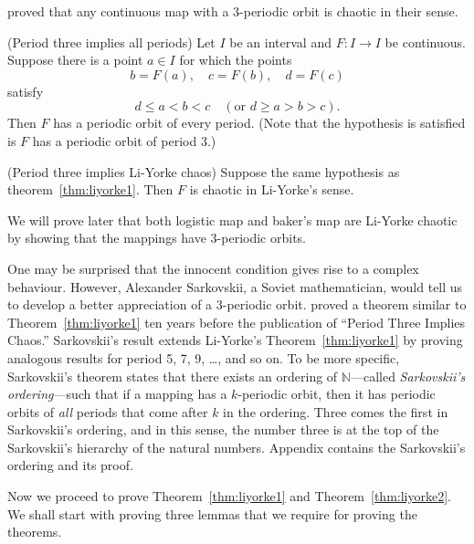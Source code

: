 \documentclass[12pt,draft,twoside]{book}
\begin{document}
\citet{li-yorke} proved that any continuous map with a 3-periodic orbit is chaotic in their sense.

\begin{theorem}
  (Period three implies all periods)
  Let $I$ be an interval and $F: I\to I$ be continuous. Suppose there is a point $a \in I$ for which
  the points
  \begin{equation*}
  b = F(a), \quad c = F(b), \quad d = F(c)
  \end{equation*}
  satisfy
  \begin{equation*}
    d \leq a < b < c \quad(\mbox{or } d \geq a > b > c).
  \end{equation*}
  Then $F$ has a periodic orbit of every period.
  (Note that the hypothesis is satisfied is $F$ has a periodic orbit of period 3.)
  \label{thm:liyorke1}
\end{theorem}

\begin{theorem}
  (Period three implies Li-Yorke chaos)
  Suppose the same hypothesis as theorem~\ref{thm:liyorke1}.
  Then $F$ is chaotic in Li-Yorke's sense.
  \label{thm:liyorke2}
\end{theorem}

\noindent We will prove later that both logistic map and baker's map are Li-Yorke chaotic by showing that the mappings have 3-periodic orbits.

One may be surprised that the innocent condition gives rise to a complex behaviour.
However, Alexander Sarkovskii, a Soviet mathematician, would tell us to develop a better appreciation of a 3-periodic orbit.
\citet{sarkovskii} proved a theorem similar to Theorem~\ref{thm:liyorke1} ten years before the publication of ``Period Three Implies Chaos.''
Sarkovskii's result extends Li-Yorke's Theorem~\ref{thm:liyorke1} by proving analogous results for period 5, 7, 9, \ldots, and so on.
To be more specific, Sarkovskii's theorem states that there exists an ordering of $\mathbb{N}$---called \textit{Sarkovskii's ordering}---such that if a mapping has a $k$-periodic orbit, then it has periodic orbits of \textit{all} periods that come after $k$ in the ordering.
Three comes the first in Sarkovskii's ordering, and in this sense, the number three is at the top of the Sarkovskii's hierarchy of the natural numbers.
Appendix contains the Sarkovskii's ordering and its proof.

Now we proceed to prove Theorem~\ref{thm:liyorke1} and Theorem~\ref{thm:liyorke2}.
We shall start with proving three lemmas that we require for proving the theorems.
\end{document}
